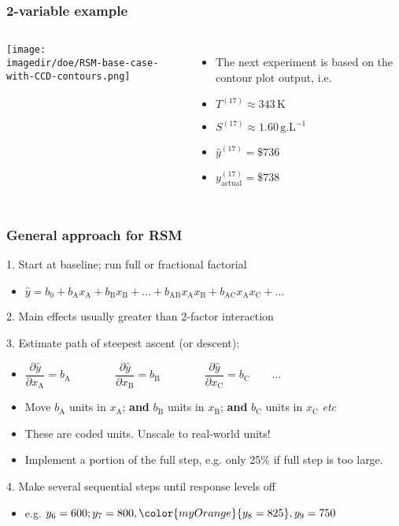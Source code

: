 \begin{frame}\frametitle{2-variable example}
	\begin{columns}
			\begin{center}
				\texttt{[image: \\imagedir/doe/RSM-base-case-with-CCD-contours.png]} 
			\end{center}
			\begin{itemize}
				\item	The next experiment is based on the contour plot output, i.e.
				\item	$T^{(17)} \approx 343\,\text{K}$
				\item	$S^{(17)} \approx 1.60\,\text{g.L}^{-1}$
				\item	$\hat{y}^{(17)} = \$736$
				\item	${y}^{(17)}_\text{actual} = \$738$
			\end{itemize}
	\end{columns}
\end{frame}

\begin{frame}\frametitle{General approach for RSM}

	1. Start at baseline; run full or fractional factorial
	\begin{itemize}
		\item	$ \hat{y} = b_0 + b_\text{A}x_\text{A} + b_\text{B} x_\text{B} + \ldots + b_\text{AB}x_\text{A}x_\text{B} + b_\text{AC} x_\text{A} x_\text{C} + \ldots$
	\end{itemize}
	2. Main effects usually greater than 2-factor interaction

	3. Estimate path of steepest ascent (or descent):
	\begin{itemize}
		\item	$\dfrac{\partial \hat{y}}{\partial x_\text{A}} = b_\text{A} \qquad\qquad \dfrac{\partial \hat{y}}{\partial x_\text{B}} = b_\text{B} \qquad\qquad \dfrac{\partial \hat{y}}{\partial x_\text{C}} = b_\text{C} \qquad \ldots$
		\item	Move $b_\text{A}$ units in $x_\text{A}$; \textbf{and} $b_\text{B}$ units in $x_\text{B}$; \textbf{and} $b_\text{C}$ units in $x_\text{C}$ \emph{etc}
		\item	These are coded units. Unscale to real-world units!
		\item	Implement a portion of the full step, e.g. only 25\% if full step is too large.
	\end{itemize}

	4. Make several sequential steps until response levels off
	\begin{itemize}
		\item	e.g. $y_6 = 600; y_7 = 800, {\color{myOrange}{y_8 = 825}}, y_9 = 750$
	\end{itemize}
\end{frame}

